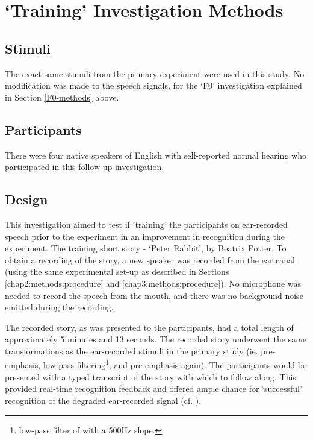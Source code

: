 \section{`Training' Investigation Methods}
\label{training-methods}

\subsection{Stimuli}

The exact same stimuli from the primary experiment were used in this study. No modification was made to the speech signals, \DIFdelbegin {}\DIFdelend \DIFaddbegin {}\DIFaddend for the `F0' investigation explained in Section \ref{F0-methods} above.

\subsection{Participants}

There were four native speakers of English with self-reported normal hearing who participated in this follow up investigation.

\subsection{Design}

This investigation aimed to test if `training' the participants on ear-recorded speech prior to the experiment \DIFdelbegin {}\DIFdelend \DIFaddbegin {}\DIFaddend in an improvement in recognition during the experiment.  The training \DIFdelbegin {}\DIFdelend \DIFaddbegin {}\DIFaddend short story - `Peter Rabbit', by Beatrix Potter.  To obtain a recording of the story, a new speaker was recorded from the ear canal (using the same experimental set-up as described in Sections \ref{chap2:methods:procedure} and \ref{chap3:methods:procedure}).  No microphone was needed to record the speech from the mouth, and there was no background noise emitted during the recording.  

The recorded story, as was presented to the participants, had a total length of approximately 5 minutes and 13 seconds.  The recorded story underwent the same transformations as the ear-recorded stimuli in the primary study (ie. pre-emphasis, low-pass filtering\footnote{\DIFaddbegin {}\DIFaddend low-pass filter of \DIFdelbegin {}\DIFdelend \DIFaddbegin {}\DIFaddend with a 500Hz slope.}, and pre-emphasis again).  The participants would be presented with a typed transcript of the story with which to follow along.  This provided real-time recognition feedback and offered ample chance for `successful' recognition of the degraded ear-recorded signal (cf. \cite{davis:05}).


